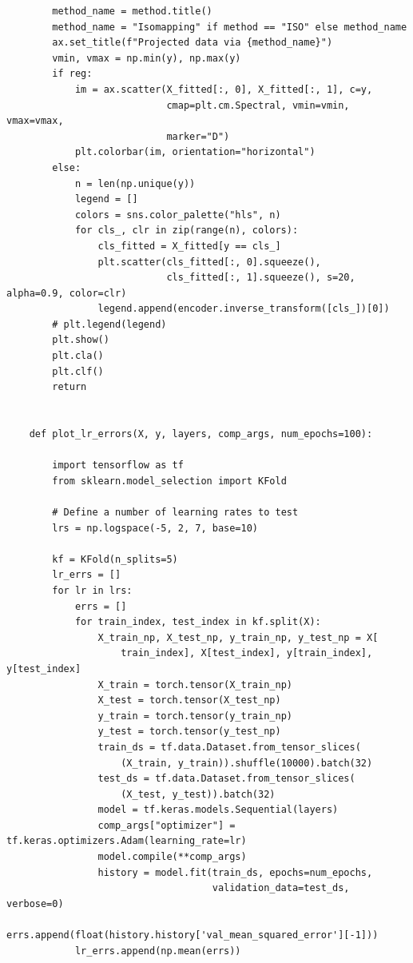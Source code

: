 \documentclass{article}
\begin{document}
\begin{verbatim}
        method_name = method.title()
        method_name = "Isomapping" if method == "ISO" else method_name
        ax.set_title(f"Projected data via {method_name}")
        vmin, vmax = np.min(y), np.max(y)
        if reg:
            im = ax.scatter(X_fitted[:, 0], X_fitted[:, 1], c=y,
                            cmap=plt.cm.Spectral, vmin=vmin, vmax=vmax,
                            marker="D")
            plt.colorbar(im, orientation="horizontal")
        else:
            n = len(np.unique(y))
            legend = []
            colors = sns.color_palette("hls", n)
            for cls_, clr in zip(range(n), colors):
                cls_fitted = X_fitted[y == cls_]
                plt.scatter(cls_fitted[:, 0].squeeze(),
                            cls_fitted[:, 1].squeeze(), s=20, alpha=0.9, color=clr)
                legend.append(encoder.inverse_transform([cls_])[0])
        # plt.legend(legend)
        plt.show()
        plt.cla()
        plt.clf()
        return
    
    
    def plot_lr_errors(X, y, layers, comp_args, num_epochs=100):
    
        import tensorflow as tf
        from sklearn.model_selection import KFold
    
        # Define a number of learning rates to test
        lrs = np.logspace(-5, 2, 7, base=10)
    
        kf = KFold(n_splits=5)
        lr_errs = []
        for lr in lrs:
            errs = []
            for train_index, test_index in kf.split(X):
                X_train_np, X_test_np, y_train_np, y_test_np = X[
                    train_index], X[test_index], y[train_index], y[test_index]
                X_train = torch.tensor(X_train_np)
                X_test = torch.tensor(X_test_np)
                y_train = torch.tensor(y_train_np)
                y_test = torch.tensor(y_test_np)
                train_ds = tf.data.Dataset.from_tensor_slices(
                    (X_train, y_train)).shuffle(10000).batch(32)
                test_ds = tf.data.Dataset.from_tensor_slices(
                    (X_test, y_test)).batch(32)
                model = tf.keras.models.Sequential(layers)
                comp_args["optimizer"] = tf.keras.optimizers.Adam(learning_rate=lr)
                model.compile(**comp_args)
                history = model.fit(train_ds, epochs=num_epochs,
                                    validation_data=test_ds, verbose=0)
                errs.append(float(history.history['val_mean_squared_error'][-1]))
            lr_errs.append(np.mean(errs))
    

\end{verbatim}
\end{document}
